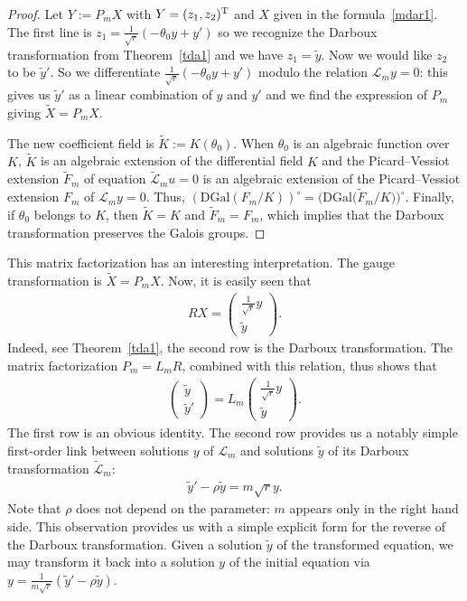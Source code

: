 \documentclass[pdftex]{sigma}%
\numberwithin{equation}{section}
\begin{document}
\begin{proof}
Let $Y:=P_m X$ with $Y=(z_1,z_2)^{\rm T}$ and $X$ given in the formula~\eqref{mdar1}. The first line is
$z_1=\frac{1}{\sqrt{r}}(-\theta_0 y + y')$ so we recognize the Darboux transformation from Theorem~\ref{tda1} and we have $z_1=\tilde{y}$. Now we would like $z_2$ to be $\tilde{y}'$.
So we differentiate $\frac{1}{\sqrt{r}}(-\theta_0 y + y')$ modulo the relation ${\mathcal{L}}_my=0$: this gives us $\tilde{y}'$ as a linear combination of $y$ and $y'$ and we find the expression of $P_m$
giving $\tilde{X}=P_m X$.

The new coefficient field is $\widetilde{K}:=K(\theta_0)$.
When $\theta_0$ is an algebraic function over $K$,
$\widetilde{K}$ is an algebraic extension of the differential field $K$ and the Picard--Vessiot extension $\widetilde{F}_m$ of equation $\widetilde{\mathcal L}_m u=0$ is an algebraic extension of the Picard--Vessiot extension $F_m$ of ${\mathcal{L}}_my=0$.
Thus, $(\mathrm{DGal}(F_m/K))^\circ =\big(\mathrm{DGal}\big(\widetilde F_m/K\big)\big)^\circ$.
Finally, if $\theta_0$ belongs to $K$, then $\widetilde K=K$ and $\widetilde{F}_m=F_m$, which implies that the Darboux transformation preserves the Galois groups.
\end{proof}

\begin{Remark}
This matrix factorization has an interesting interpretation. The gauge transformation is $\widetilde{X} = P_m X$.
Now, it is easily seen that
\begin{gather*}
R X = \begin{pmatrix} \frac{1}{\sqrt{r}}y \\ \tilde{y} \end{pmatrix}\!.
\end{gather*}
Indeed, see Theorem~\ref{tda1}, the second row is the Darboux transformation. The matrix factorization $P_m=L_m R$, combined with this relation, thus shows
that
\begin{gather*}
\begin{pmatrix} \tilde{y} \\ \tilde{y}' \end{pmatrix} = L_m \begin{pmatrix} \frac{1}{\sqrt{r}}y \\ \tilde{y} \end{pmatrix}\!.
\end{gather*}
The first row is an obvious identity.
The second row provides us a notably simple first-order link between solutions $y$ of $\mathcal{L}_m$ and solutions $\tilde{y}$ of its Darboux transformation $\widetilde{\mathcal{L}}_m$:
\begin{gather*}
\tilde{y}' - \rho \tilde{y} = m \sqrt{r} y.
\end{gather*}
Note that $\rho$ does not depend on the parameter: $m$ appears only in the right hand side.
This observation provides us with a simple explicit form for the reverse of the Darboux transformation. Given a solution $\tilde{y}$ of the transformed equation, we may transform it back into a solution $y$ of the initial equation via $y = \frac1{m \sqrt{r}}(\tilde{y}' - \rho \tilde{y})$.
\end{Remark}
\end{document}
